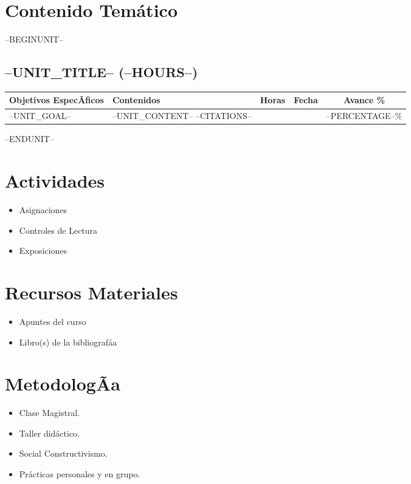 \documentclass[a4paper]{article}
\begin{document}
\section{Contenido Temático}
--BEGINUNIT--
\subsection{--UNIT_TITLE-- (--HOURS--)}
\begin{tabularx}{\textwidth}{|X|X|c|c|c|} \hline
\textbf{Objetivos EspecÃ­ficos} &   \textbf{Contenidos} & \textbf{Horas} & \textbf{Fecha} & \textbf{Avance \%}  \\ \hline
--UNIT_GOAL--      & 
--UNIT_CONTENT--
--CITATIONS-- &
&
&
--PERCENTAGE--\% \\ \hline
\end{tabularx}

--ENDUNIT--


\section{Actividades}
\begin{itemize}
\item Asignaciones
\item Controles de Lectura
\item Exposiciones
\end{itemize} 

\section{Recursos Materiales}
\begin{itemize}
\item Apuntes del curso
\item Libro(s) de la bibliografáa
\end{itemize} 

\section{MetodologÃ­a}
\begin{itemize}
\item Clase Magistral.
\item Taller didáctico.
\item Social Constructivismo.
\item Prácticas personales y en grupo.
\end{itemize} 
\end{document}
